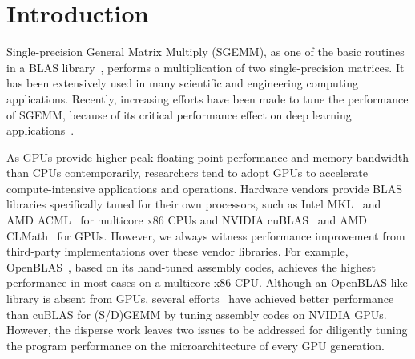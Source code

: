 \section{Introduction}
Single-precision General Matrix Multiply (SGEMM), as one 
of the basic routines in a BLAS library~\cite{blas,intel2007intel,amd2014}, performs a multiplication of two single-precision matrices. 
It has been extensively used in many scientific and engineering 
computing applications. 
Recently, increasing efforts have been made to tune the performance of SGEMM, because of its critical performance effect on deep learning applications~\cite{chetlur2014cudnn,nervana_sgemm_wiki}.

As GPUs provide higher peak floating-point performance and memory bandwidth than CPUs contemporarily, researchers tend to adopt GPUs to accelerate compute-intensive applications and operations. 
Hardware vendors provide BLAS libraries specifically tuned for their own processors, such as Intel MKL~\cite{intel2007intel} and AMD ACML~\cite{amd2014} for multicore x86 CPUs and NVIDIA cuBLAS~\cite{intel2007intel} and AMD CLMath~\cite{clmath} for GPUs. 
However, we always witness performance improvement from third-party implementations over these vendor libraries. 
For example, OpenBLAS~\cite{xianyi2012openblas}, based on its hand-tuned assembly codes, achieves the highest performance in most cases on a multicore x86 CPU.
Although an OpenBLAS-like library is absent from GPUs, several %
efforts~\cite{tan,lai,nervana_sgemm_wiki,
chien, volkov} have achieved better performance than cuBLAS for (S/D)GEMM by tuning assembly codes on NVIDIA GPUs. 
However, %
the disperse work leaves two issues to be addressed for diligently tuning the program performance on the microarchitecture of every GPU generation.

